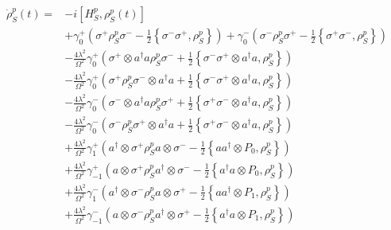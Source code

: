 	\begin{align*}
		\dot{\rho}_S^p(t) = &-i \left[H_S^p,  {\rho}_S^p(t)\right] \\
		&+\gamma_0^+ \left( \sigma^+ \rho_S^p \sigma^- - \frac{1}{2} \left\{\sigma^- \sigma^+, \rho_S^p \right\}\right) + \gamma_0^- \left(  \sigma^- \rho_S^p \sigma^+ - \frac{1}{2} \left\{\sigma^+ \sigma^-, \rho_S^p \right\}\right) \\
		&- \frac{4 \lambda^2}{\Omega^2} \gamma^+_0 \left(\sigma^+ \otimes a^\dagger a \rho_S^p \sigma^- + \frac{1}{2} \left\{\sigma^- \sigma^+ \otimes a^\dagger a, \rho_S^p \right\}\right) \\
		&- \frac{4 \lambda^2}{\Omega^2} \gamma^+_0 \left(\sigma^+ \rho_S^p \sigma^- \otimes a^\dagger a  + \frac{1}{2} \left\{\sigma^- \sigma^+ \otimes a^\dagger a, \rho_S^p \right\}\right) \\
		&- \frac{4 \lambda^2}{\Omega^2} \gamma^-_0 \left(\sigma^- \otimes a^\dagger a \rho_S^p \sigma^+ + \frac{1}{2} \left\{\sigma^+ \sigma^- \otimes a^\dagger a, \rho_S^p \right\}\right) \\
		&- \frac{4 \lambda^2}{\Omega^2} \gamma^-_0 \left(\sigma^- \rho_S^p \sigma^+ \otimes a^\dagger a  + \frac{1}{2} \left\{\sigma^+ \sigma^- \otimes a^\dagger a, \rho_S^p \right\}\right) \\
		&+ \frac{4 \lambda^2}{\Omega^2} \gamma^+_{1} \left(a^\dagger \otimes \sigma^+ \rho_S^p a \otimes \sigma^- - \frac{1}{2}\left\{aa^\dagger \otimes P_0, \rho_S^p \right\}\right) \\
		&+ \frac{4 \lambda^2}{\Omega^2} \gamma^+_{-1} \left(a\otimes \sigma^+ \rho_S^p a^\dagger  \otimes \sigma^- - \frac{1}{2}\left\{a^\dagger a\otimes P_0, \rho_S^p \right\}\right) \\
		&+ \frac{4 \lambda^2}{\Omega^2} \gamma^-_{1} \left(a^\dagger \otimes \sigma^- \rho_S^p a \otimes \sigma^+ - \frac{1}{2}\left\{aa^\dagger \otimes P_1, \rho_S^p \right\}\right) \\
		&+ \frac{4 \lambda^2}{\Omega^2} \gamma^-_{-1} \left(a\otimes \sigma^- \rho_S^p a^\dagger  \otimes \sigma^+ - \frac{1}{2}\left\{a^\dagger  a\otimes P_1, \rho_S^p \right\}\right) \\
	\end{align*}
